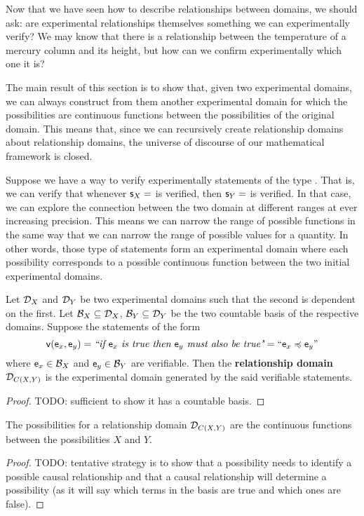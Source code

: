 \documentclass[11pt,letterpaper,fleqn]{memoir} %
\begin{document}
Now that we have seen how to describe relationships between domains, we should ask: are experimental relationships themselves something we can experimentally verify? We may know that there is a relationship between the temperature of a mercury column and its height, but how can we confirm experimentally which one it is?

The main result of this section is to show that, given two experimental domains, we can always construct from them another experimental domain for which the possibilities are continuous functions between the possibilities of the original domain. This means that, since we can recursively create relationship domains about relationship domains, the universe of discourse of our mathematical framework is closed.

Suppose we have a way to verify experimentally statements of the type . That is, we can verify that whenever $\stmt_X=$ is verified, then $\stmt_Y=$ is verified. In that case, we can explore the connection between the two domain at different ranges at ever increasing precision. This means we can narrow the range of possible functions in the same way that we can narrow the range of possible values for a quantity. In other words, those type of statements form an experimental domain where each possibility corresponds to a possible continuous function between the two initial experimental domains.

\begin{mathSection}
	\begin{defn}
		Let $\edomain_X$ and $\edomain_Y$ be two experimental domains such that the second is dependent on the first. Let $\basis_X \subseteq \edomain_X$,  $\basis_Y \subseteq \edomain_Y$ be the two countable basis of the respective domains. Suppose the statements of the form
		$$\obs[v](\obs[e]_x, \obs[e]_y) = \statement{if $\obs[e]_x$ is true then $\obs[e]_y$ must also be true}=``\obs[e]_x \narrower \obs[e]_y"$$
		where $\obs[e]_x \in \basis_X$ and $ \obs[e]_y \in \basis_Y$ are verifiable. Then the \textbf{relationship domain} $\edomain_{C(X,Y)}$ is the experimental domain generated by the said verifiable statements.
	\end{defn}
	\begin{proof}
		TODO: sufficient to show it has a countable basis.
	\end{proof}
\begin{prop}
	The possibilities for a relationship domain $\edomain_{C(X,Y)}$ are the continuous functions between the possibilities $X$ and $Y$.
\end{prop}
\begin{proof}
	TODO: tentative strategy is to show that a possibility needs to identify a possible causal relationship and that a causal relationship will determine a possibility (as it will say which terms in the basis are true and which ones are false).
\end{proof}
\end{mathSection}
\end{document}
